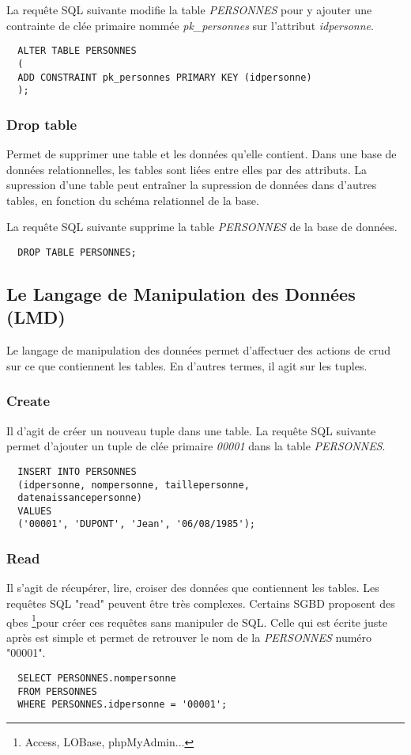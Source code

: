 La requête SQL suivante modifie la table \textit{PERSONNES} pour y ajouter une contrainte de clée primaire nommée \textit{pk\_personnes} sur l'attribut \textit{idpersonne}.

\begin{lstlisting}
  ALTER TABLE PERSONNES
  (
  ADD CONSTRAINT pk_personnes PRIMARY KEY (idpersonne)
  );
\end{lstlisting}

\subsubsection{Drop table}
Permet de supprimer une table et les données qu'elle contient.
Dans une base de données relationnelles, les tables sont liées entre elles par des attributs.
La supression d'une table peut entraîner la supression de données dans d'autres tables, en fonction du schéma relationnel de la base.

La requête SQL suivante supprime la table \textit{PERSONNES} de la base de données.
\begin{lstlisting}
  DROP TABLE PERSONNES;
\end{lstlisting}

\subsection{Le Langage de Manipulation des Données (LMD)}
Le langage de manipulation des données permet d'affectuer des actions de \gls{crud} sur ce que contiennent les tables.
En d'autres termes, il agit sur les tuples.

\subsubsection{Create}
Il d'agit de créer un nouveau tuple dans une table.
La requête SQL suivante permet d'ajouter un tuple de clée primaire \textit{00001} dans la table \textit{PERSONNES}.
\begin{lstlisting}
  INSERT INTO PERSONNES
  (idpersonne, nompersonne, taillepersonne,
  datenaissancepersonne)
  VALUES
  ('00001', 'DUPONT', 'Jean', '06/08/1985');
\end{lstlisting}

\subsubsection{Read}
Il s'agit de récupérer, lire, croiser des données que contiennent les tables.
Les requêtes SQL  "read" peuvent être très complexes.
Certains SGBD proposent des \glspl{qbe}
\footnote{Access, LOBase, phpMyAdmin...}pour créer ces requêtes sans manipuler de SQL.
Celle qui est écrite juste après est simple et permet de retrouver le nom de la \textit{PERSONNES} numéro "00001".
\begin{lstlisting}
  SELECT PERSONNES.nompersonne
  FROM PERSONNES
  WHERE PERSONNES.idpersonne = '00001';
\end{lstlisting}

